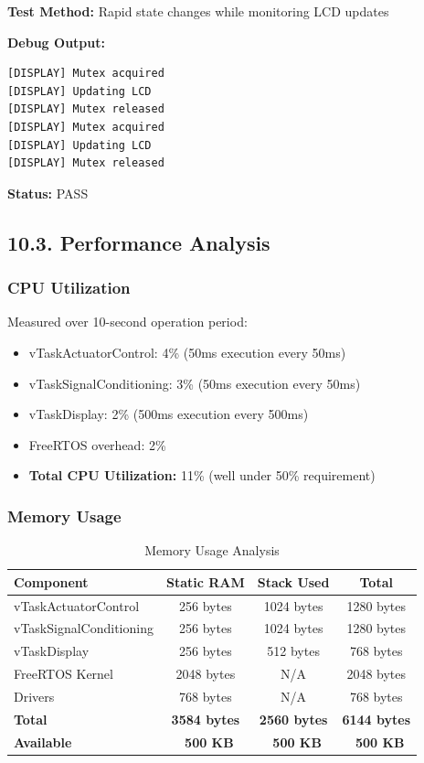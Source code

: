 \documentclass[12pt]{article}
\begin{document}
\textbf{Test Method:} Rapid state changes while monitoring LCD updates

\textbf{Debug Output:}
\begin{verbatim}
[DISPLAY] Mutex acquired
[DISPLAY] Updating LCD
[DISPLAY] Mutex released
[DISPLAY] Mutex acquired
[DISPLAY] Updating LCD
[DISPLAY] Mutex released
\end{verbatim}

\textbf{Status:} PASS

\subsection*{10.3. Performance Analysis}

\subsubsection*{CPU Utilization}

Measured over 10-second operation period:

\begin{itemize}
    \item vTaskActuatorControl: 4\% (50ms execution every 50ms)
    \item vTaskSignalConditioning: 3\% (50ms execution every 50ms)
    \item vTaskDisplay: 2\% (500ms execution every 500ms)
    \item FreeRTOS overhead: 2\%
    \item \textbf{Total CPU Utilization:} 11\% (well under 50\% requirement)
\end{itemize}

\subsubsection*{Memory Usage}

\begin{table}[H]
	\centering
	\caption{Memory Usage Analysis}
	\label{tab:memory-usage}
	\begin{tabular}{|l|c|c|c|}
		\hline
		\textbf{Component} & \textbf{Static RAM} & \textbf{Stack Used} & \textbf{Total} \\
		\hline
		vTaskActuatorControl & 256 bytes & 1024 bytes & 1280 bytes \\
		\hline
		vTaskSignalConditioning & 256 bytes & 1024 bytes & 1280 bytes \\
		\hline
		vTaskDisplay & 256 bytes & 512 bytes & 768 bytes \\
		\hline
		FreeRTOS Kernel & 2048 bytes & N/A & 2048 bytes \\
		\hline
		Drivers & 768 bytes & N/A & 768 bytes \\
		\hline
		\textbf{Total} & \textbf{3584 bytes} & \textbf{2560 bytes} & \textbf{6144 bytes} \\
		\hline
		\textbf{Available} & \textbf{~500 KB} & \textbf{~500 KB} & \textbf{~500 KB} \\
		\hline
	\end{tabular}
\end{table}
\end{document}
